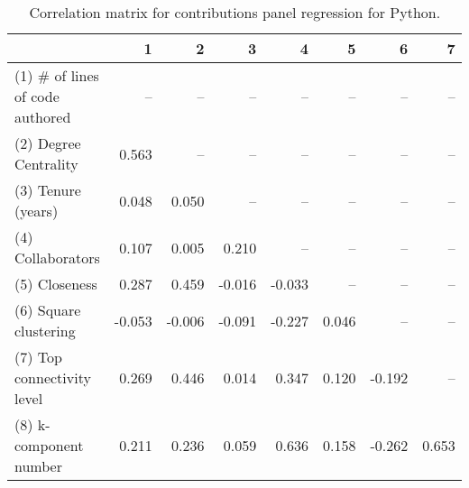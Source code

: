 \begin{table}[H]
\caption{Correlation matrix for contributions panel regression for Python.}
\label{corr_table_panel}
\begin{center}
\begin{small}
\begin{tabular}{lrrrrrrr}
\toprule
{} &      1 &      2 &      3 &      4 &     5 &      6 &     7 \\
\midrule
(1) \# of lines of code authored &    -- &    -- &    -- &    -- &   -- &    -- &   -- \\
(2) Degree Centrality           &  0.563 &    -- &    -- &    -- &   -- &    -- &   -- \\
(3) Tenure (years)              &  0.048 &  0.050 &    -- &    -- &   -- &    -- &   -- \\
(4) Collaborators               &  0.107 &  0.005 &  0.210 &    -- &   -- &    -- &   -- \\
(5) Closeness                   &  0.287 &  0.459 & -0.016 & -0.033 &   -- &    -- &   -- \\
(6) Square clustering           & -0.053 & -0.006 & -0.091 & -0.227 & 0.046 &    -- &   -- \\
(7) Top connectivity level      &  0.269 &  0.446 &  0.014 &  0.347 & 0.120 & -0.192 &   -- \\
(8) k-component number          &  0.211 &  0.236 &  0.059 &  0.636 & 0.158 & -0.262 & 0.653 \\
\bottomrule
\end{tabular}
\end{small} 
\end{center} 
\end{table}
